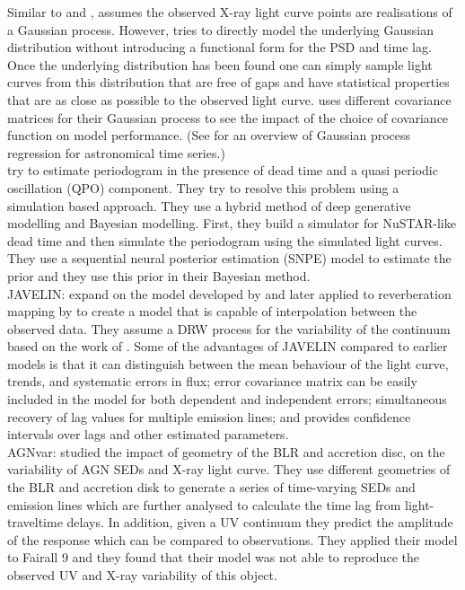 \documentclass{aa}
\begin{document}
Similar to \citet{Zoghbi2013} and \citet{Kelly2014}, \citet{Wilkins2019} assumes the observed X-ray light curve points are realisations of a Gaussian process. However, \citet{Wilkins2019} tries to directly model the underlying Gaussian distribution without introducing a functional form for the PSD and time lag. Once the underlying distribution has been found one can simply sample light curves from this distribution that are free of gaps and have statistical properties that are as close as possible to the observed light curve. \citet{Wilkins2019} uses different covariance matrices for their Gaussian process to see the impact of the choice of covariance function on model performance. (See \citet{AigrainForemanMackey2023} for an overview of Gaussian process regression for astronomical time series.) \\ 
\citet{HuppenkothenBachetti2022} try to estimate periodogram in the presence of dead time and a quasi periodic oscillation (QPO) component. They try to resolve this problem using a simulation based approach. They use a hybrid method of deep generative modelling and Bayesian modelling. First, they build a simulator for NuSTAR-like dead time and then simulate the periodogram using the simulated light curves. They use a sequential neural posterior estimation (SNPE) model to estimate the prior and they use this prior in their Bayesian method. \\
JAVELIN: \citet{Zu2011} expand on the model developed by \citet{RybickiPress1992} and later applied to reverberation mapping by \citet{RybickiKleyna1994} to create a model that is capable of interpolation between the observed data. They assume a DRW process for the variability of the continuum based on the work of \citet{Kelly2009}. Some of the advantages of JAVELIN compared to earlier models is that it can distinguish between the mean behaviour of the light curve, trends, and systematic errors in flux; error covariance matrix can be easily included in the model for both dependent and independent errors; simultaneous recovery of lag values for multiple emission lines; and provides confidence intervals over lags and other estimated parameters. \\
AGNvar: \citet{ScottHagenDone2023} studied the impact of geometry of the BLR and accretion disc, on the variability of AGN SEDs and X-ray light curve. They use different geometries of the BLR and accretion disk to generate a series of time-varying SEDs and emission lines which are further analysed to calculate the time lag from light-traveltime delays. In addition, given a UV continuum they predict the amplitude of the response which can be compared to observations. They applied their model to Fairall 9 and they found that their model was not able to reproduce the observed UV and X-ray variability of this object. \\
\end{document}
